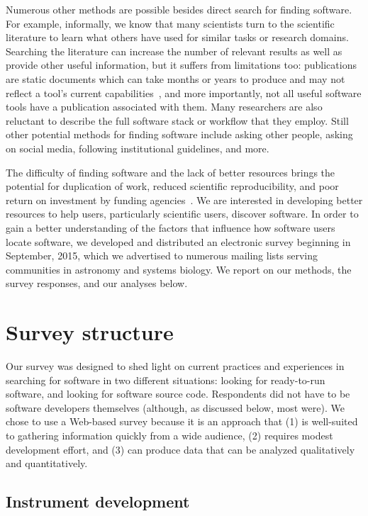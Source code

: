 \documentclass{casicswhitepaper}
\begin{document}
Numerous other methods are possible besides direct search for finding software.  For example, informally, we know that many scientists turn to the scientific literature to learn what others have used for similar tasks or research domains.  Searching the literature can increase the number of relevant results as well as provide other useful information, but it suffers from limitations too: publications are static documents which can take months or years to produce and may not reflect a tool's current capabilities~\cite{wren_2004}, and more importantly, not all useful software tools have a publication associated with them.  Many researchers are also reluctant to describe the full software stack or workflow that they employ.  Still other potential methods for finding software include asking other people, asking on social media, following institutional guidelines, and more.

The difficulty of finding software and the lack of better resources brings the potential for duplication of work, reduced scientific reproducibility, and poor return on investment by funding agencies~\citep{cannata_2005}.  We are interested in developing better resources to help users, particularly scientific users, discover software.  In order to gain a better understanding of the factors that influence how software users locate software, we developed and distributed an electronic survey beginning in September, 2015, which we advertised to numerous mailing lists serving communities in astronomy and systems biology.  We report on our methods, the survey responses, and our analyses below.


\section{Survey structure}

Our survey was designed to shed light on current practices and experiences in searching for software in two different situations: looking for ready-to-run software, and looking for software source code.  Respondents did not have to be software developers themselves (although, as discussed below, most were).  We chose to use a Web-based survey because it is an approach that (1) is well-suited to gathering information quickly from a wide audience, (2) requires modest development effort, and (3) can produce data that can be analyzed qualitatively and quantitatively.


\subsection{Instrument development}
\end{document}
